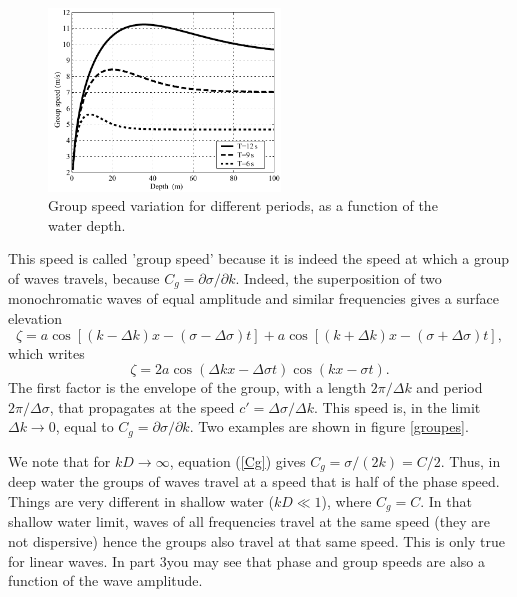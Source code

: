 \begin{figure}
\centerline{\includegraphics[width=0.55\textwidth]{FIGS_CH_AIRY/cg_en.pdf}}
  \caption{Group speed variation for different periods, as a function of the water depth.}
\label{Cgplot}
\end{figure}

This speed is called 'group speed' because it is indeed the speed at which a group of waves travels, because $C_g=\partial
\sigma/\partial k$. Indeed, the superposition of two monochromatic waves of equal amplitude and similar frequencies gives a surface elevation 
\begin{equation}
    \zeta=a  \cos \left[ \left(k - \Delta k \right) x - \left(\sigma-\Delta \sigma \right) t \right]
        + a  \cos \left[ \left(k + \Delta k \right) x - \left(\sigma+\Delta \sigma \right) t\right]  ,
\end{equation}
which writes
\begin{equation}
    \zeta=2 a \cos \left(\Delta k x -\Delta \sigma t\right)
    \cos \left( k x - \sigma t\right).
\end{equation}
The first factor is the envelope of the group, with a length  $2 \pi /
\Delta k $ and period $2\pi / \Delta \sigma$, that propagates at the speed 
$c'=\Delta \sigma /\Delta k $. This speed is, in the limit  $\Delta k \rightarrow 0$, equal to 
$C_g=\partial \sigma/\partial k$. Two examples are shown in figure 
\ref{groupes}.


We note that for $kD\rightarrow\infty$, equation (\ref{Cg}) gives
$C_g={\sigma}/({2k})=C/2$. Thus, in deep water the groups of waves travel at a speed that is half of the phase speed. 
Things are very different in shallow water ($kD
\ll 1$), where $C_g=C$. In that shallow water limit, waves of all frequencies travel at the same speed (they are not dispersive)
hence the groups also travel at that same speed. This is only true for linear waves. In part 3you may see that  phase and group speeds 
are also a function of the wave amplitude. 


